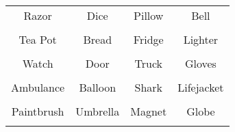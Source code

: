 \documentclass[12pt,a4paper]{article}
\begin{document}
\thispagestyle{empty}
\begin{table}[]
\centering
\Huge
\begin{tabular}{cccc}
 Razor& Dice& Pillow& Bell\\  & & & \\
 Tea Pot& Bread& Fridge& Lighter\\  & & & \\
 Watch& Door& Truck& Gloves\\  & & & \\
 Ambulance& Balloon& Shark& Lifejacket\\  & & & \\
 Paintbrush& Umbrella& Magnet& Globe\\  & & & \\
\end{tabular}
\end{table}
\end{document}
